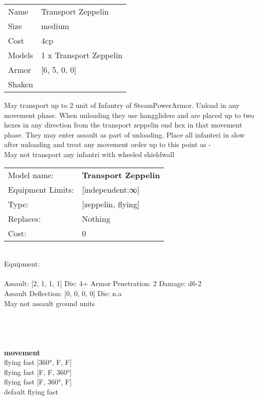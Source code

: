 \begin{tabular}{ll}
  Name & Transport Zeppelin \\
  Size & medium\\
  Cost & 4cp\\
  Models & 1 x Transport Zeppelin\\
  Armor & [6, 5, 0, 0]\\
  Shaken & \\
\end{tabular}

\noindent May transport up to 2 unit of Infantry of SteamPowerArmor. Unload in any movement phase. When unloading they use hanggliders and are placed up to two hexes in any direction from the transport zeppelin end hex in that movement phase. They may enter assault as part of unloading. Place all infanteri in slow after unloading and treat any movement order up to this point as -\\ 
May not transport any infantri with wheeled shieldwall\\ 


\noindent
\begin{tabular}{ll}
Model name: &{\bf Transport Zeppelin } \\
Equipment Limits: &[independent:∞] \\
Type: &[zeppelin, flying] \\
Replaces: &Nothing \\
Cost: & 0\\
\end{tabular}
\ \\
Equipment:  \\
\ \\
Assault: [2, 1, 1, 1] Die: 4+ Armor Penetration: 2 Damage: d6-2 \\
Assault Deflection: [0, 0, 0, 0] Die: n.a\\
\indent May not assault ground units\\ 
 
\ \\

\ \\
 
\ \\



\ \\ {\bf movement } \\
flying fast [360°, F, F] \\
flying fast [F, F, 360°] \\
flying fast [F, 360°, F] \\
default flying fast \\


